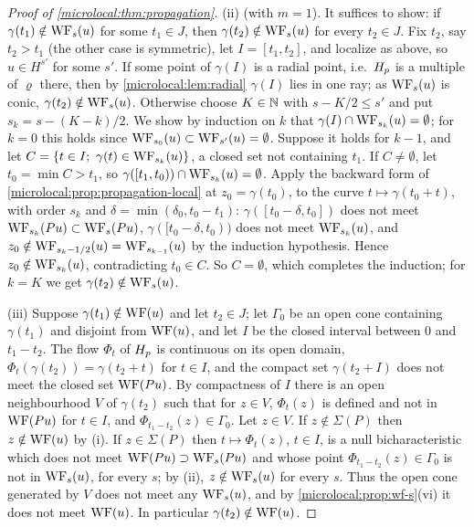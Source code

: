 \begin{proof}[Proof of \cref{microlocal:thm:propagation}]
  (ii) (with $m=1$). It suffices to show: if $\gamma(t_1)\notin\operatorname{WF}_s(u)$ for some
  $t_1\in J$, then $\gamma(t_2)\notin\operatorname{WF}_s(u)$ for every $t_2\in J$. Fix $t_2$, say
  $t_2>t_1$ (the other case is symmetric), let $I=[t_1,t_2]$, and localize as
  above, so $u\in H^{s'}$ for some $s'$. If some point of $\gamma(I)$ is a radial
  point, i.e.\ $H_{p}$ is a multiple of $\varrho$ there, then by
  \cref{microlocal:lem:radial} $\gamma(I)$ lies in one ray; as $\operatorname{WF}_s(u)$ is
  conic, $\gamma(t_2)\notin\operatorname{WF}_s(u)$. Otherwise choose $K\in\mathbb{N}$ with $s-K/2\le s'$
  and put $s_k=s-(K-k)/2$. We show by induction on $k$ that
  $\gamma(I)\cap\operatorname{WF}_{s_k}(u)=\emptyset$; for $k=0$ this holds since
  $\operatorname{WF}_{s_0}(u)\subset\operatorname{WF}_{s'}(u)=\emptyset$. Suppose it holds for $k-1$, and let
  $C=\{t\in I;\ \gamma(t)\in\WF_{s_k}(u)\}$, a closed set not containing $t_1$. If
  $C\ne\emptyset$, let $t_0=\min C>t_1$, so $\gamma([t_1,t_0))\cap\operatorname{WF}_{s_k}(u)=\emptyset$.
  Apply the backward form of \cref{microlocal:prop:propagation-local} at
  $z_0=\gamma(t_0)$, to the curve $t\mapsto\gamma(t_0+t)$, with order $s_k$ and
  $\delta=\min(\delta_0,t_0-t_1)$: $\gamma([t_0-\delta,t_0])$ does not meet
  $\operatorname{WF}_{s_k}(Pu)\subset\operatorname{WF}_s(Pu)$, $\gamma([t_0-\delta,t_0))$ does not meet
  $\operatorname{WF}_{s_k}(u)$, and $z_0\notin\operatorname{WF}_{s_k-1/2}(u)=\operatorname{WF}_{s_{k-1}}(u)$ by the induction
  hypothesis. Hence $z_0\notin\operatorname{WF}_{s_k}(u)$, contradicting $t_0\in C$. So
  $C=\emptyset$, which completes the induction; for $k=K$ we get
  $\gamma(t_2)\notin\operatorname{WF}_s(u)$.

  (iii) Suppose $\gamma(t_1)\notin\operatorname{WF}(u)$ and let $t_2\in J$; let $\Gamma_0$ be an
  open cone containing $\gamma(t_1)$ and disjoint from $\operatorname{WF}(u)$, and let $I$ be
  the closed interval between $0$ and $t_1-t_2$. The flow $\Phi_t$ of $H_{p}$
  is continuous on its open domain, $\Phi_t(\gamma(t_2))=\gamma(t_2+t)$ for $t\in I$,
  and the compact set $\gamma(t_2+I)$ does not meet the closed set $\operatorname{WF}(Pu)$. By
  compactness of $I$ there is an open neighbourhood $V$ of $\gamma(t_2)$ such that
  for $z\in V$, $\Phi_t(z)$ is defined and not in $\operatorname{WF}(Pu)$ for $t\in I$, and
  $\Phi_{t_1-t_2}(z)\in\Gamma_0$. Let $z\in V$. If $z\notin\Sigma(P)$ then $z\notin\operatorname{WF}(u)$
  by (i). If $z\in\Sigma(P)$ then $t\mapsto\Phi_t(z)$, $t\in I$, is a null
  bicharacteristic which does not meet $\operatorname{WF}(Pu)\supset\operatorname{WF}_s(Pu)$ and whose
  point $\Phi_{t_1-t_2}(z)\in\Gamma_0$ is not in $\operatorname{WF}_s(u)$, for every $s$; by (ii),
  $z\notin\operatorname{WF}_s(u)$ for every $s$. Thus the open cone generated by $V$ does not
  meet any $\operatorname{WF}_s(u)$, and by \cref{microlocal:prop:wf-s}(vi) it does not meet
  $\operatorname{WF}(u)$. In particular $\gamma(t_2)\notin\operatorname{WF}(u)$.
\end{proof}

